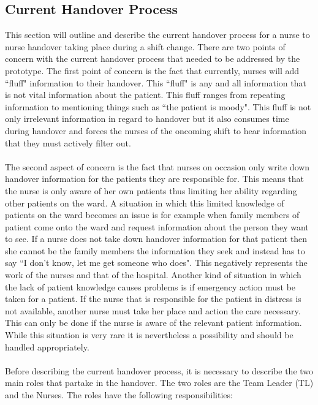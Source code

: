 \subsection{Current Handover Process}
This section will outline and describe the current handover process for a nurse to nurse handover taking place during a shift change. There are two points of concern with the current handover process that needed to be addressed by the prototype. The first point of concern is the fact that currently, nurses will add ``fluff" information to their handover. This ``fluff" is any and all information that is not vital information about the patient. This fluff ranges from repeating information to mentioning things such as ``the patient is moody". This fluff is not only irrelevant information in regard to handover but it also consumes time during handover and forces the nurses of the oncoming shift to hear information that they must actively filter out.
\\ \\
The second aspect of concern is the fact that nurses on occasion only write down handover information for the patients they are responsible for. This means that the nurse is only aware of her own patients thus limiting her ability regarding other patients on the ward. A situation in which this limited knowledge of patients on the ward becomes an issue is for example when family members of patient come onto the ward and request information about the person they want to see. If a nurse does not take down handover information for that patient then she cannot be the family members the information they seek and instead has to say ``I don't know, let me get someone who does". This negatively represents the work of the nurses and that of the hospital. Another kind of situation in which the lack of patient knowledge causes problems is if emergency action must be taken for a patient. If the nurse that is responsible for the patient in distress is not available, another nurse must take her place and action the care necessary. This can only be done if the nurse is aware of the relevant patient information. While this situation is very rare it is nevertheless a possibility and should be handled appropriately. 
\\ \\
Before describing the current handover process, it is necessary to describe the two main roles that partake in the handover. The two roles are the Team Leader (TL) and the Nurses. The roles have the following responsibilities: \\ \\


